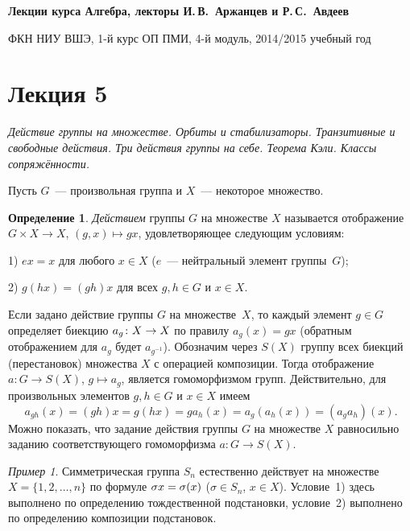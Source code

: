 \documentclass[a4paper,10pt]{amsart}
\theoremstyle{definition}
\newtheorem{definition}{Определение}
\theoremstyle{remark}
\newtheorem{example}{Пример}
\begin{document}
%
\sloppy
%
\centerline{\large \bf Лекции курса \guillemotleft
Алгебра\guillemotright{}, лекторы И.\,В.~Аржанцев и Р.\,С.~Авдеев}

\smallskip

\centerline{\large ФКН НИУ ВШЭ, 1-й курс ОП ПМИ, 4-й модуль,
2014/2015 учебный год}


\bigskip

\section*{Лекция 5}

\medskip

{\it Действие группы на множестве. Орбиты и стабилизаторы.
Транзитивные и свободные действия. Три действия группы на себе.
Теорема Кэли. Классы сопряжённости.}

Пусть $G$~--- произвольная группа и $X$~--- некоторое множество.

\begin{definition}
\textit{Действием} группы $G$ на множестве $X$ называется
отображение $G\times X\to X$, $(g,x)\mapsto gx$, удовлетворяющее
следующим условиям:

1) $ex=x$ для любого $x\in X$ ($e$~--- нейтральный элемент
группы~$G$);

2) $g(hx)=(gh)x$ для всех $g,h\in G$ и $x\in X$.
\end{definition}

Если задано действие группы $G$ на множестве~$X$, то каждый элемент
$g \in G$ определяет биекцию $a_g \colon X \to\nobreak X$ по правилу
$a_g(x) = gx$ (обратным отображением для $a_g$ будет $a_{g^{-1}}$).
Обозначим через $S(X)$ группу всех биекций (перестановок) множества
$X$ с операцией композиции. Тогда отображение $a \colon G \to S(X)$,
$g \mapsto a_g$, является гомоморфизмом групп. Действительно, для
произвольных элементов $g,h \in G$ и $x \in X$ имеем
$$
a_{gh}(x) = (gh)x = g(hx) = g a_h(x) = a_g (a_h(x)) = (a_g a_h)(x).
$$
Можно показать, что задание действия группы $G$ на множестве $X$
равносильно заданию соответствующего гомоморфизма $a \colon G \to
S(X)$.

\begin{example}
Симметрическая группа $S_n$ естественно действует на множестве $X =
\lbrace 1, 2, \ldots, n \rbrace$ по формуле $\sigma x =\nobreak
\sigma (x)$ ($\sigma \in S_n$, $x \in X$). Условие~1) здесь
выполнено по определению тождественной подстановки, условие~2)
выполнено по определению композиции подстановок.
\end{example}
\end{document}
